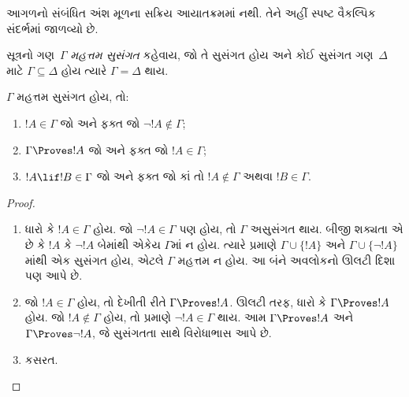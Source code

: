 \OLEndChapterHook


\begin{editorial}
આગળનો સંબંધિત અંશ મૂળના સક્રિય આયાતક્રમમાં નથી. તેને અહીં સ્પષ્ટ વૈકલ્પિક સંદર્ભમાં જાળવ્યો છે.
\end{editorial}
\begingroup
\makeatletter{}\makeatother


\label{guunit:OLP-0714}


\begin{defn}
સૂત્રનો ગણ~$\Gamma$ \emph{મહત્તમ સુસંગત} કહેવાય,
જો તે સુસંગત હોય અને કોઈ સુસંગત ગણ~$\Delta$ માટે
$\Gamma \subseteq \Delta$ હોય ત્યારે $\Gamma = \Delta$ થાય.
\end{defn}

\begin{lem}[સત્ય સહાયક પ્રમેય]
$\Gamma$ મહત્તમ સુસંગત હોય, તો:
\begin{enumerate}
\item {} $!A \in \Gamma$ જો અને ફક્ત જો
  $\lnot !A \notin \Gamma$;
\item {} $\Gamma \Proves !A$ જો અને ફક્ત જો
  $!A \in \Gamma$;
\item {} $!A \lif !B \in \Gamma$ જો અને ફક્ત જો
  કાં તો $!A \notin \Gamma$ અથવા $!B \in \Gamma$.
\end{enumerate}
\end{lem}

\begin{proof}
\begin{enumerate}
\item ધારો કે $!A \in \Gamma$ હોય. જો $\lnot !A \in \Gamma$
  પણ હોય, તો $\Gamma$ અસુસંગત થાય.
  બીજી શક્યતા એ છે કે $!A$ કે $\lnot!A$ બેમાંથી એકેય
  $\Gamma$માં ન હોય. ત્યારે
   પ્રમાણે
  $\Gamma\cup\{!A\}$ અને $\Gamma \cup \{\lnot !A\}$માંથી
  એક સુસંગત હોય, એટલે $\Gamma$ મહત્તમ ન હોય.
  આ બંને અવલોકનો ઊલટી દિશા પણ આપે છે.
\item જો $!A \in \Gamma$ હોય, તો દેખીતી રીતે $\Gamma \Proves !A$.
  ઊલટી તરફ, ધારો કે $\Gamma \Proves !A$ હોય.
  જો $!A \notin \Gamma$ હોય, તો 
  પ્રમાણે $\lnot !A \in \Gamma$ થાય.
  આમ $\Gamma \Proves !A$ અને $\Gamma \Proves \lnot !A$,
  જે સુસંગતતા સાથે વિરોધાભાસ આપે છે.
\item કસરત.
\end{enumerate}
\end{proof}

